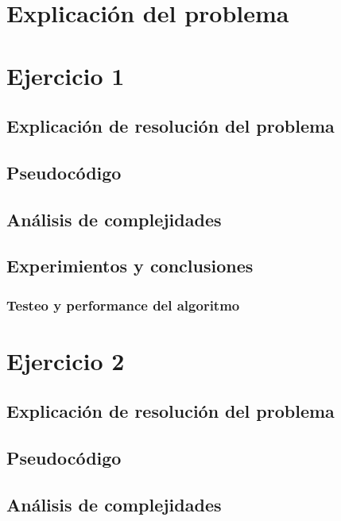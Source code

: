 \documentclass[12pt, a4paper]{article}
\begin{document}
\maketitle
\tableofcontents
\newpage

\newpage
\section{Explicación del problema}

\newpage
\section{Ejercicio 1} 
\subsection{Explicaci\'on de resoluci\'on del problema}

\subsection{Pseudoc\'odigo}

\subsection{An\'alisis de complejidades}

\subsection{Experimientos y conclusiones}
\subsubsection[1.5]{Testeo y performance del algoritmo}



\newpage
\section{Ejercicio 2} 
\subsection{Explicaci\'on de resoluci\'on del problema}

\subsection{Pseudoc\'odigo}

\subsection{An\'alisis de complejidades}

\end{document}
